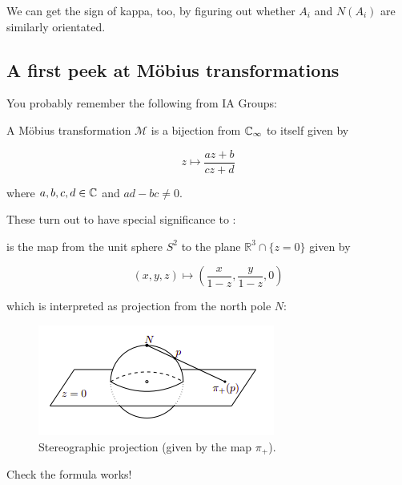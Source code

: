 \documentclass[11pt]{scrartcl}
\begin{document}
\begin{remark}
    We can get the sign of kappa, too, by figuring out whether $A_i$ and $N(A_i)$ are similarly orientated.
\end{remark}

\subsection{A first peek at M{\"o}bius transformations} %

You probably remember the following from IA Groups:

\begin{definition}
A M{\"o}bius transformation $\mathcal{M}$ is a bijection from $\mathbb C_\infty$ to itself given by 

\begin{equation}
    z \mapsto \frac{az+b}{cz+d}
\end{equation}

where $a,b,c,d \in \mathbb C$ and $ad-bc \neq 0$.
\end{definition}

These turn out to have special significance to :

\begin{definition}
 is the map from the unit sphere $S^2$ to the plane $\mathbb{R}^3 \cap \{ z=0 \}$ given by 

\begin{equation}
    (x,y,z) \mapsto \left( \frac{x}{1-z} , \frac{y}{1-z}, 0 \right)
\end{equation}

which is interpreted as projection from the north pole $N$:

\begin{figure}[h]
\centering
\includegraphics[scale=0.5]{Selection_228.png}
\caption{Stereographic projection (given by the map $\pi_+$).}
\label{fig:stereofig}
\end{figure}
\end{definition}

\begin{exercise}
Check the formula works!
\end{exercise}
\end{document}
